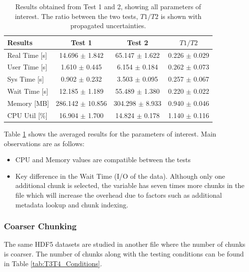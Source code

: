 \documentclass{article}
\begin{document}
\begin{table}[h!] 
    \centering 
    \begin{tabular}{lccc}
        \hline
        \textbf{Results}  & Test 1               & Test 2               & $T1/T2$ \\ \hline
        Real Time [s]     & 14.696 $\pm$ 1.842   & 65.147 $\pm$ 1.622   & 0.226 $\pm$ 0.029 \\
        User Time [s]     & 1.610  $\pm$ 0.445   & 6.154  $\pm$ 0.184   & 0.262 $\pm$ 0.073 \\
        Sys Time [s]      & 0.902  $\pm$ 0.232   & 3.503  $\pm$ 0.095   & 0.257 $\pm$ 0.067 \\
        Wait Time [s]     & 12.185 $\pm$ 1.189   & 55.489 $\pm$ 1.380   & 0.220 $\pm$ 0.022 \\
        Memory [MB]       & 286.142 $\pm$ 10.856 & 304.298 $\pm$ 8.933  & 0.940 $\pm$ 0.046 \\
        CPU Util [\%]     & 16.904 $\pm$ 1.700   & 14.824 $\pm$ 0.178   & 1.140 $\pm$ 0.116 \\
        \hline
    \end{tabular}
    \caption{Results obtained from Test 1 and 2, showing all parameters of interest. The ratio between the two tests, $T1/T2$ is shown with propagated uncertainties.} 
    \label{tab:T1T2_Results} 
\end{table}

\noindent Table \ref{tab:T1T2_Results} shows the averaged results for the parameters of interest. Main observations are as follows:
\begin{itemize}
    \item CPU and Memory values are compatible between the tests
    \item Key difference in the Wait Time (I/O of the data). Although only one additional chunk is selected, the variable has seven times more chunks in the file which will increase the overhead due to factors such as additional metadata lookup and chunk indexing. 

\end{itemize}

\subsubsection{Coarser Chunking}
The same HDF5 datasets are studied in another file where the number of chunks is coarser. The number of chunks along with the testing conditions can be found in Table \ref{tab:T3T4_Conditions}. 
\end{document}
